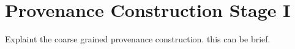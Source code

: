 \section{Provenance Construction Stage I}
\label{s:prov-stg1}

Explaint the coarse grained provenance construction. this can be brief.


